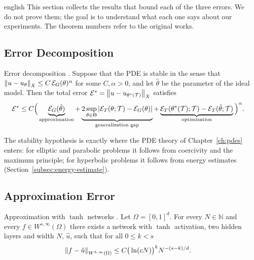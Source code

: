 \documentclass[../0000.tex]{subfiles}
\begin{document}
\begin{hyphenrules}{english}
This section collects the results that bound each of the three errors. We do not prove them; the goal
is to understand what each one says about our experiments. The theorem numbers refer to the original
works.

\subsection{Error Decomposition}

\begin{teorema}{Error decomposition \cite[Lemma~3.1 and Eq.~3.11]{deryck2022generic,deryck2024acta}.}\label{thm:error-decomp}
Suppose that the PDE is stable in the sense that $\left\lVert u-u_\theta \right\rVert_X\le C\,\mathcal{E}_G(\theta)^{\alpha}$
for some $C,\alpha>0$, and let $\hat\theta$ be the parameter of the ideal model. Then the total error
$\mathcal{E}^{*}=\left\lVert u-u_{\theta^{*}(\mathcal{T})} \right\rVert_X$ satisfies
\[
  \mathcal{E}^{*}\le C\Big(\underbrace{\mathcal{E}_G(\hat\theta)}_{\text{approximation}}
  +\underbrace{2\sup_{\theta\in\Theta}\left\lvert \mathcal{E}_T(\theta;\mathcal{T})-\mathcal{E}_G(\theta) \right\rvert}_{\text{generalization gap}}
  +\underbrace{\mathcal{E}_T(\theta^{*}(\mathcal{T});\mathcal{T})-\mathcal{E}_T(\hat\theta;\mathcal{T})}_{\text{optimization}}\Big)^{\alpha}.
\]
\end{teorema}

The stability hypothesis is exactly where the PDE theory of Chapter~\ref{ch:pdes} enters: for elliptic and
parabolic problems it follows from coercivity and the maximum principle; for hyperbolic problems it
follows from energy estimates (Section~\ref{subsec:energy-estimate}).

\subsection{Approximation Error}

\begin{teorema}{Approximation with $\tanh$ networks \cite[Theorem~4.4]{deryck2021tanh}.}\label{thm:tanh-approx}
Let $\Omega=[0,1]^d$. For every $N\in\mathbb{N}$ and every $f\in W^{s,\infty}(\Omega)$ there exists a network
with $\tanh$ activation, two hidden layers and width $N$, $\hat u$, such that for all $0\le k<s$
\[
  \left\lVert f-\hat u \right\rVert_{W^{k,\infty}(\Omega)}\le C\big(\ln(cN)\big)^{k}N^{-(s-k)/d}.
\]
\end{teorema}


\end{hyphenrules}
\end{document}
